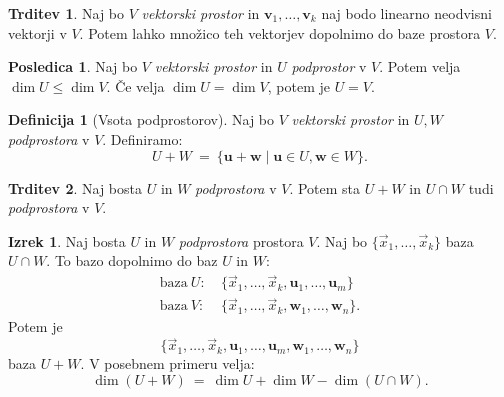 \documentclass[11pt]{article}
\renewcommand{\u}{\mathbf{u}}
\newcommand{\vv}{\mathbf{v}}
\newcommand{\0}{\mathbf{0}}
\newcommand{\w}{\mathbf{w}}
\theoremstyle{definition}
\newtheorem{definicija}{Definicija}[section]
\theoremstyle{definition}
\newtheorem{trditev}{Trditev}[section]
\theoremstyle{definition}
\newtheorem{izrek}{Izrek}[section]
\theoremstyle{definition}
\newtheorem*{posledica}{Posledica}
\begin{document}
\begin{trditev}

Naj bo $V$ \textit{vektorski prostor} in $\vv_1,\ldots,\vv_k$ naj bodo linearno neodvisni vektorji v $V$. Potem lahko množico teh vektorjev dopolnimo do baze prostora $V$.

\end{trditev}
\vspace{0.5cm}

\begin{posledica}

Naj bo $V$ \textit{vektorski prostor} in $U$ \textit{podprostor} v $V$. Potem velja $\dim U \leq \dim V$. Če velja $\dim U = \dim V$, potem je $U=V$.

\end{posledica}
\vspace{0.5cm}

\begin{definicija}[Vsota podprostorov]

Naj bo $V$ \textit{vektorski prostor} in $U,W$ \textit{podprostora} v $V$. Definiramo:
$$U+W ~=~ \{\u + \w \mid \u \in U, \w \in W\}.$$

\end{definicija}
\vspace{0.5cm}

\begin{trditev}

Naj bosta $U$ in $W$ \textit{podprostora} v $V$. Potem sta $U+W$ in $U \cap W$ tudi \textit{podprostora} v $V$.

\end{trditev}
\vspace{0.5cm}

\begin{izrek}

Naj bosta $U$ in $W$ \textit{podprostora} prostora $V$. Naj bo $\{\vec{x}_1,\ldots,\vec{x}_k\}$ baza $U \cap W$. To bazo dopolnimo do baz $U$ in $W$:
\begin{align*}
\text{baza}~U: ~&\{\vec{x}_1,\ldots,\vec{x}_k,\u_1,\ldots,\u_m\} \\
\text{baza}~V: ~&\{\vec{x}_1,\ldots,\vec{x}_k,\w_1,\ldots,\w_n\}.
\end{align*}
Potem je
$$\{\vec{x}_1,\ldots,\vec{x}_k,\u_1,\ldots,\u_m,\w_1,\ldots,\w_n\}$$
baza $U+W$. V posebnem primeru velja:
$$\dim(U+W) ~=~ \dim U + \dim W - \dim(U \cap W).$$

\end{izrek}
\vspace{0.5cm}
\end{document}
